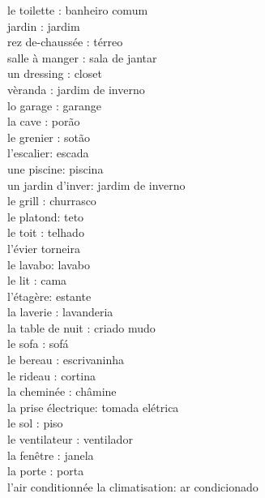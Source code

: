 \documentclass{article}
\begin{document}
                                le          toilette     : banheiro comum\\
                                            jardin       : jardim\\
                                rez         de-chaussée  : térreo\\
                                salle       à manger     : sala de jantar\\
                                un          dressing     : closet\\
                                            vèranda      : jardim de inverno\\
                                lo          garage       : garange\\
                                la          cave         : porão\\
                                le          grenier      : sotão\\
        l'escalier: escada\\
        une piscine: piscina\\
        un jardin d'inver: jardim de inverno\\
        le grill  : churrasco\\
        le platond: teto\\
        le toit   : telhado\\
        l'évier torneira\\
        le lavabo: lavabo\\
        le lit   : cama\\
        l'étagère: estante\\
        la laverie         : lavanderia\\
        la table de nuit   : criado mudo\\
        le sofa            : sofá\\
        le bereau          : escrivaninha\\
        le rideau          : cortina\\
        la cheminée        : châmine\\
        la prise électrique: tomada elétrica\\
        le sol             : piso\\
        le ventilateur     : ventilador\\
        la fenêtre         : janela\\
        la porte           : porta\\
        l'air conditionnée la climatisation: ar condicionado\\
\end{document}
